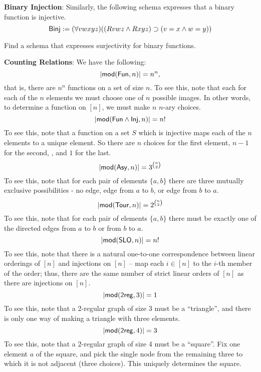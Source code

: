 \begin{mdframed}[linewidth=1]
\textbf{Binary Injection}: Similarly, the following schema expresses that a binary function is injective. 
\[
    \mbox{$\mathsf{Binj}$}:= (\forall vwxyz)((Rvwz \land Rxyz) \supset (v = x \land w = y))
\]
\begin{aside}
Find a schema that expresses surjectivity for binary functions.%
\end{aside}
\textbf{Counting Relations}: We have the following:
\[
    |\mbox{$\mathsf{mod}(\mbox{$\mathsf{Fun}$},n)$}| = n^n,
\]
that is, there are $n^n$ functions on a set of size $n$. To see this, note that each for each of the $n$ elements we must choose one of $n$ possible images. In other words, to determine a function on $[n]$, we must make $n$ $n$-ary choices.%
\[
    |\mbox{$\mathsf{mod}(\mbox{$\mathsf{Fun}$}\land\mbox{$\mathsf{Inj}$},n)$}| = n!
\]
To see this, note that a function on a set $S$ which is injective maps each of the $n$ elements to a unique element. So there are $n$ choices for the first element, $n-1$ for the second, \textellipsis, and $1$ for the last. 
\[
    |\mbox{$\mathsf{mod}(\mbox{$\mathsf{Asy}$},n)$}| = 3^{\binom{n}{2}}
\]
To see this, note that for each pair of elements $\{a, b\}$ there are three mutually exclusive possibilities - no edge, edge from $a$ to $b$, or edge from $b$ to $a$. 
\[
    |\mbox{$\mathsf{mod}(\mbox{$\mathsf{Tour}$},n)$}| = 2^{\binom{n}{2}}
\]
To see this, note that for each pair of elements $\{a,b\}$ there must be exactly one of the directed edges  from $a$ to $b$ or from $b$ to $a$. 
\[
    |\mbox{$\mathsf{mod}(\mbox{$\mathsf{SLO}$},n)$}| = n!
\]
To see this, note that there is a natural one-to-one correspondence between linear orderings of $[n]$ and injections on $[n]$ -- map each $i\in[n]$ to the $i$-th member of the order; thus, there are the same number of strict linear orders of $[n]$ as there are injections on $[n]$.%
\[
    |\mbox{$\mathsf{mod}(\mbox{$\mathsf{2reg}$},3)$}| = 1
\]
To see this, note that a 2-regular graph of size 3 must be a ``triangle'', and there is only one way of making a triangle with three elements. 
\[
    |\mbox{$\mathsf{mod}(\mbox{$\mathsf{2reg}$},4)$}| = 3
\]
To see this, note that a 2-regular graph of size 4 must be a ``square''. Fix one element $a$ of the square, and pick the single node from the remaining three to which it is not adjacent (three choices). This uniquely determines the square. 



\end{mdframed}
